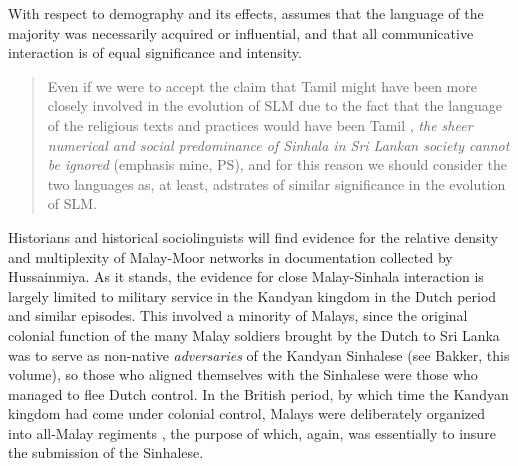 With respect to demography and its effects, \citet{Ansaldo2008genesis} assumes that the language of the majority was necessarily acquired or influential, and that all communicative interaction is of equal\textbf{ }significance and intensity.

\begin{quote}
 Even if we were to accept the claim that Tamil might have been more closely involved in the evolution of SLM due to the fact that the language of the religious texts and practices would have been Tamil \citep{Hussainmiya1987}, \textit{the sheer numerical and social predominance of Sinhala in Sri Lankan society cannot be ignored} (emphasis mine, PS), and for this reason we should consider the two languages as, at least, adstrates of similar significance in the evolution of SLM.  
\end{quote}


Historians and historical sociolinguists will find evidence for the relative density and multiplexity of Malay-Moor networks in documentation collected by Hussainmiya. As it stands, the evidence for close Malay-Sinhala interaction is largely limited to military service in the Kandyan kingdom in the Dutch period and similar episodes. This involved a minority of Malays, since the original colonial function of the many Malay soldiers brought by the Dutch to Sri Lanka was to serve as non-native \textit{adversaries} of the Kandyan Sinhalese (see Bakker, this volume), so those who aligned themselves with the Sinhalese were those who managed to flee Dutch control. In the British period, by which time the Kandyan kingdom had come under colonial control, Malays were deliberately organized into all-Malay regiments \citep{Hussainmiya1990,Hussainmiya2008}, the purpose of which, again, was essentially to insure the submission of the Sinhalese.

